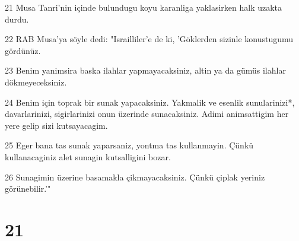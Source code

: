 \par 21 Musa Tanri'nin içinde bulundugu koyu karanliga yaklasirken halk uzakta durdu.
\par 22 RAB Musa'ya söyle dedi: "Israilliler'e de ki, 'Göklerden sizinle konustugumu gördünüz.
\par 23 Benim yanimsira baska ilahlar yapmayacaksiniz, altin ya da gümüs ilahlar dökmeyeceksiniz.
\par 24 Benim için toprak bir sunak yapacaksiniz. Yakmalik ve esenlik sunularinizi*, davarlarinizi, sigirlarinizi onun üzerinde sunacaksiniz. Adimi animsattigim her yere gelip sizi kutsayacagim.
\par 25 Eger bana tas sunak yaparsaniz, yontma tas kullanmayin. Çünkü kullanacaginiz alet sunagin kutsalligini bozar.
\par 26 Sunagimin üzerine basamakla çikmayacaksiniz. Çünkü çiplak yeriniz görünebilir.'"

\chapter{21}

